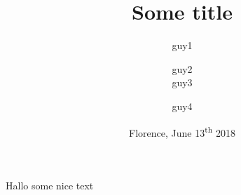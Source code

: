 \documentclass{beamer}
\title[]{Some title}
\author[]{guy1  \and guy2  \\
            guy3  \and guy4 }
\date{Florence, June 13\textsuperscript{th} 2018}
\begin{document}
         \begin{frame}[plain]
          \titlepage
          \end{frame}

           \begin{frame}{Hallo}
          some nice text
          \end{frame}

          
\end{document}
